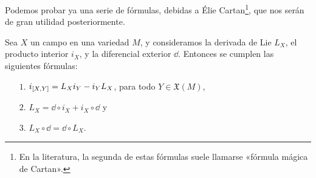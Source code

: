Podemos probar ya una serie de fórmulas, debidas a Élie Cartan\footnote{En la literatura, la segunda de estas fórmulas suele llamarse «fórmula mágica de Cartan».}, que nos serán de gran utilidad posteriormente.
\begin{thm}
  Sea $X$ un campo en una variedad $M$, y consideramos la derivada de Lie $L_X$, el producto interior $i_X$, y la diferencial exterior $\dd$. Entonces se cumplen las siguientes fórmulas:
  \begin{enumerate}
    \item[$1$.] $i_{\left[X,Y\right]}=L_X i_Y - i_Y L_X$, para todo $Y \in \mathfrak{X}(M)$,
    \item[$2$.] $L_X= \dd \circ i_X + i_X \circ \dd $ y
    \item[$3$.] $L_X\circ \dd = \dd \circ L_X$.
  \end{enumerate}
\end{thm}
